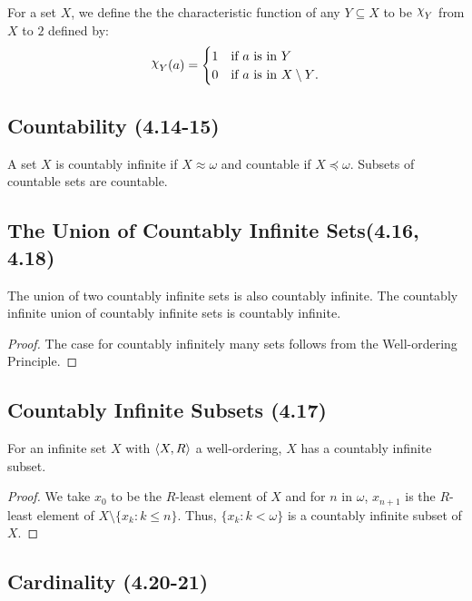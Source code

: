 For a set $X$, we define the the characteristic function of any $Y \subseteq X$
to be $\varchi_Y$ from $X$ to $2$ defined by: \begin{align*}
    \varchi_Y(a) = \begin{cases}
        1 & \text{if $a$ is in $Y$} \\
        0 & \text{if $a$ is in $X \setminus Y$}.
    \end{cases}
\end{align*}

\subsection{Countability (4.14-15)} \label{4.14} \label{4.15}

A set $X$ is countably infinite if $X \approx \omega$ and countable if 
$X \preceq \omega$. Subsets of countable sets are countable.

\subsection{The Union of Countably Infinite Sets(4.16, 4.18)} \label{4.16} \label{4.18}

The union of two countably infinite sets is also countably infinite.
The countably infinite union of countably infinite sets is countably infinite.

\begin{proof}
    The case for countably infinitely many sets follows from the Well-ordering
    Principle.
\end{proof}

\subsection{Countably Infinite Subsets (4.17)} \label{4.17}

For an infinite set $X$ with ${\langle X, R \rangle}$ a well-ordering, $X$ has a
countably infinite subset.

\begin{proof}
    We take $x_0$ to be the $R$-least element of $X$ and
    for $n$ in $\omega$, $x_{n + 1}$ is the $R$-least element of
    $X \setminus \{x_k : k \leq n\}$. Thus, $\{x_k : k < \omega\}$
    is a countably infinite subset of $X$.
\end{proof}

\subsection{Cardinality (4.20-21)} \label{4.20} \label{4.21}

